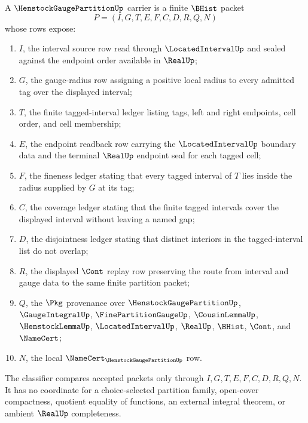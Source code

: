 \begin{definition}
\label{def:henstock-gauge-partition-carrier}
A $\HenstockGaugePartitionUp$ carrier is a finite $\BHist$ packet
$$
P=(I,G,T,E,F,C,D,R,Q,N)
$$
whose rows expose:
\begin{enumerate}
\item $I$, the interval source row read through $\LocatedIntervalUp$ and sealed against the endpoint order available in $\RealUp$;
\item $G$, the gauge-radius row assigning a positive local radius to every admitted tag over the displayed interval;
\item $T$, the finite tagged-interval ledger listing tags, left and right endpoints, cell order, and cell membership;
\item $E$, the endpoint readback row carrying the $\LocatedIntervalUp$ boundary data and the terminal $\RealUp$ endpoint seal for each tagged cell;
\item $F$, the fineness ledger stating that every tagged interval of $T$ lies inside the radius supplied by $G$ at its tag;
\item $C$, the coverage ledger stating that the finite tagged intervals cover the displayed interval without leaving a named gap;
\item $D$, the disjointness ledger stating that distinct interiors in the tagged-interval list do not overlap;
\item $R$, the displayed $\Cont$ replay row preserving the route from interval and gauge data to the same finite partition packet;
\item $Q$, the $\Pkg$ provenance over $\HenstockGaugePartitionUp$, $\GaugeIntegralUp$, $\FinePartitionGaugeUp$, $\CousinLemmaUp$, $\HenstockLemmaUp$, $\LocatedIntervalUp$, $\RealUp$, $\BHist$, $\Cont$, and $\NameCert$;
\item $N$, the local $\NameCert_{\HenstockGaugePartitionUp}$ row.
\end{enumerate}
The classifier compares accepted packets only through $I,G,T,E,F,C,D,R,Q,N$. It has no coordinate for a choice-selected partition family, open-cover compactness, quotient equality of functions, an external integral theorem, or ambient $\RealUp$ completeness.
\end{definition}

